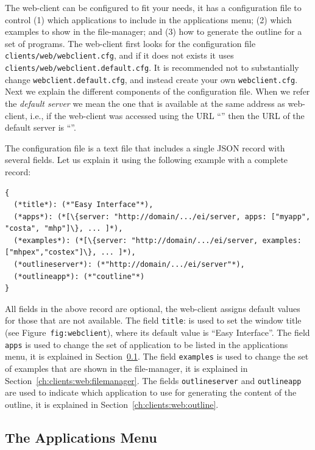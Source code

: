 The web-client can be configured to fit your needs, it has a
configuration file to control (1) which applications to include in the
applications menu; (2) which examples to show in the file-manager; and
(3) how to generate the outline for a set of programs.
%
The web-client first looks for the configuration file
\texttt{clients/web/webclient.cfg}, and if it does not exists it uses
\texttt{clients/web/webclient.default.cfg}.
%
It is recommended not to substantially change
\texttt{webclient.default.cfg}, and instead create your own
\texttt{webclient.cfg}.
%
Next we explain the different components of the configuration
file. When we refer the \emph{default server} we mean the one that is
available at the same address as web-client, i.e., if the web-client
was accessed using the URL
``'' then the URL of the
default server is ``''.

The configuration file is a text file that includes a single JSON
record with several fields. Let us explain it using the following
example with a complete record:

\bigskip
\begin{lstlisting}
{
  (*title*): (*"Easy Interface"*),
  (*apps*): (*[\{server: "http://domain/.../ei/server, apps: ["myapp", "costa", "mhp"]\}, ... ]*),
  (*examples*): (*[\{server: "http://domain/.../ei/server, examples: ["mhpex","costex"]\}, ... ]*),
  (*outlineserver*): (*"http://domain/.../ei/server"*),
  (*outlineapp*): (*"coutline"*)
}
\end{lstlisting}

\bigskip
\noindent
All fields in the above record are optional, the web-client assigns
default values for those that are not available. 
%
The field \texttt{title}: is used to set the window title (see
Figure~\texttt{fig:webclient}), where its default value is ``Easy
Interface''. The field \texttt{apps} is used to change the set of
application to be listed in the applications menu, it is explained in
Section~\ref{ch:clients:web:appsmenu}. The field \texttt{examples} is
used to change the set of examples that are shown in the file-manager,
it is explained in Section~\ref{ch:clients:web:filemanager}. The
fields \texttt{outlineserver} and \texttt{outlineapp} are used to
indicate which application to use for generating the content of the
outline, it is explained in Section~\ref{ch:clients:web:outline}.

\subsection{The Applications Menu}
\label{ch:clients:web:appsmenu}

